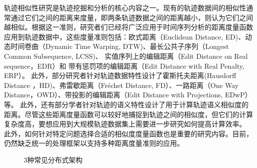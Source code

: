          轨迹相似性研究是轨迹挖掘和分析的核心内容之一。现有的轨迹数据间的相似性通常通过它们之间的距离来度量，即两条轨迹数据之间的距离越小，则认为它们之间越相似。根据这一准则，研究者们已经将广泛应用于时间序列分析的距离度量函数应用到轨迹数据中，这些度量准则包括：欧式距离（Euclidean Distance, ED)\cite{DTKST}、动态时间卷曲（Dynamic Time Warping, DTW)\cite{bandwidth}、最长公共子序列（Longest Common Subsequence, LCSS)\cite{crowdsourced,SmartTrace}、
         实值序列上的编辑距离（Edit Distance on Real sequence，EDR）\cite{EDR}和 带有惩罚项的编辑距离（Edit Distance with Real Penalty, ERP）\cite{ERP}。
         此外，部分研究者针对轨迹数据特性设计了霍斯托夫距离(Hausdorff Distance ，HD)\cite{MaoSJZZ16}、弗雷歇距离（Fréchet Distance, FD）\cite{ZhuLYZHZ10,Guo2017}、一路距离（One Way Distance，OWD）\cite{LinS08}、带投影的编辑距离（Edit Distance with Projections, EDwP）\cite{RanuPTDR15}等。
         此外，还有部分学者针对轨迹的语义特性设计了用于计算轨迹语义相似度的距离\cite{Liu012,ZhaoX11,ZhengYZXSZ15}。尽管这些距离度量函数可以较好地捕捉到轨迹之间的相似度，但它们的计算复杂度高，要想应用到大规模轨迹数据集上需要进一步研究如何提高计算效率。
         此外，如何针对特定问题选择合适的相似度度量函数也是重要的研究内容\cite{Magdy2016Review,TooheyD15}。目前，仍然缺乏统一的处理框架以支持多种距离度量准则的应用。 
         \begin{figure}
         	\centering
         	\caption{3种常见分布式架构}
         	\label{fig:DistributeArc}
         \end{figure}
         
